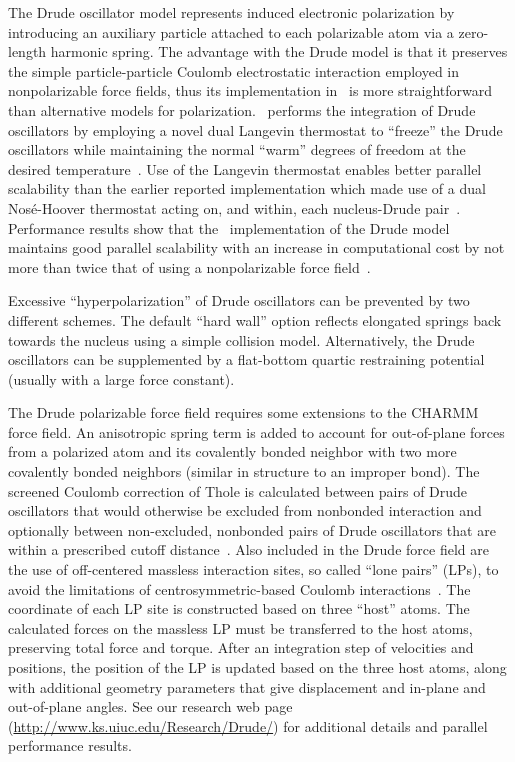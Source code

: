 The Drude oscillator model represents induced electronic polarization by
  introducing an auxiliary particle attached to each polarizable atom via a
  zero-length harmonic spring.
The advantage with the Drude model is that it preserves the simple
  particle-particle Coulomb electrostatic interaction employed in
  nonpolarizable force fields, thus its implementation in \NAMD\ is more
  straightforward than alternative models for polarization.
\NAMD\ performs the integration of Drude oscillators by employing a novel dual
  Langevin thermostat to ``freeze'' the Drude oscillators while maintaining the
  normal ``warm'' degrees of freedom at the desired
  temperature~\cite{JIAN2011}.
Use of the Langevin thermostat enables better parallel scalability than the
  earlier reported implementation which made use of a dual Nos\'e-Hoover
  thermostat acting on, and within, each
  nucleus-Drude pair~\cite{Lamoureux-2003a}.
Performance results show that the \NAMD\ implementation of the Drude model
  maintains good parallel scalability with an increase in computational cost by
  not more than twice that of using a nonpolarizable force
  field~\cite{JIAN2011}.

Excessive ``hyperpolarization'' of Drude oscillators can be prevented by two
  different schemes.
The default ``hard wall'' option reflects elongated springs back towards the
  nucleus using a simple collision model.
Alternatively, the Drude oscillators can be supplemented by a flat-bottom
  quartic restraining potential (usually with a large force constant).

The Drude polarizable force field requires some extensions to the CHARMM force
  field.
An anisotropic spring term is added to account for out-of-plane forces from a
  polarized atom and its covalently bonded neighbor with two more covalently
  bonded neighbors (similar in structure to an improper bond).
The screened Coulomb correction of Thole is calculated between pairs of Drude
  oscillators that would otherwise be excluded from nonbonded interaction and
  optionally between non-excluded, nonbonded pairs of Drude oscillators
  that are within a prescribed cutoff distance~\cite{Thole81,van1998molecular}.
Also included in the Drude force field are the use of off-centered massless
  interaction sites, so called ``lone pairs'' (LPs), to avoid the limitations
  of centrosymmetric-based Coulomb interactions~\cite{Harder2006}.
The coordinate of each LP site is constructed based on three ``host'' atoms.
The calculated forces on the massless LP must be transferred to the host atoms,
  preserving total force and torque.
After an integration step of velocities and positions, the position of the LP
  is updated based on the three host atoms, along with additional geometry
  parameters that give displacement and in-plane and out-of-plane angles.
See our research web page (\url{http://www.ks.uiuc.edu/Research/Drude/}) for
  additional details and parallel performance results.


